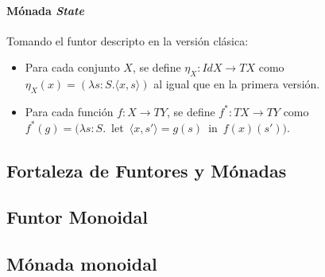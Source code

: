 \paragraph{M\'onada \textit{State}} Tomando el funtor descripto en la versión clásica:
\vspace{-0.75\baselineskip}
\begin{itemize}[noitemsep, label=$\blacktriangleright$]
	\item Para cada conjunto $X$, se define $\eta_X : \mathit{Id} X \rightarrow \mathit{T} X$ como $\eta_X (x) = (\lambda s : S . \langle x , s \rangle)$ al igual que en la primera versión.
	\item Para cada función $f : X \rightarrow \mathit{T}Y$, se define $f^* : \mathit{T} X \rightarrow \mathit{T} Y$ como \\ \mbox{$f^*(g) = (\lambda s : S .$ let $\langle x , s' \rangle = g(s)$ in $f(x)(s'))$}.
\end{itemize}

\subsection{Fortaleza de Funtores y Mónadas}\label{monadas:strength}

\subsection{Funtor Monoidal}\label{monadas:monoidalfunctor}

\subsection{Mónada monoidal}\label{monadas:monoidalmonad}



